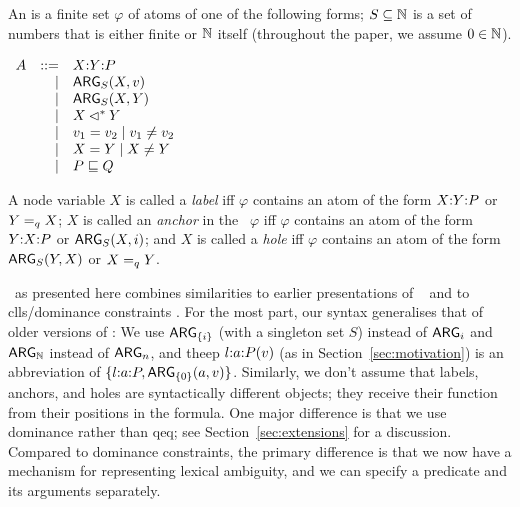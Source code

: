 \begin{definition}\label{defn:rmrs-syntax}
  An \emph{\rmrs} is a finite set $\varphi$ of atoms of one of the
  following forms; $S \subseteq \mathbb{N}$ is a set of numbers that is either
  finite or $\mathbb{N}$ itself (throughout the paper, we assume 
    $0 \in \mathbb{N}$).

$\begin{array}{rrll}
A &::= &\ep{X}{Y}{P} \\ %
&| &\ARG_S(X,v) \\ %
&| &\ARG_S(X,Y) \\ %
&| &X \dom Y \\ %
&| &v_1 = v_2 \;|\; v_1 \neq v_2 \\ %
&| &X = Y \;|\; X \neq Y \\ %
&| &P \spec Q %
\end{array}
$

A node variable $X$ is called a \emph{label} iff $\varphi$ contains an
atom of the form $X {:} Y {:} P$ or $Y =_q X$; $X$ is called an
\emph{anchor} in the \rmrs\ $\varphi$ iff $\varphi$ contains an atom
of the form $Y {:} X {:} P$ or $\mathsf{ARG}_S(X,i)$; and $X$ is called a
\emph{hole} iff $\varphi$ contains an atom of the form $\mathsf{ARG}_S(Y,X)$
or $X =_q Y$.
\end{definition}

\rmrs\ as presented here combines similarities to earlier
presentations of \rmrs\ \cite{copestake:2003,copestake:2007b} and to
{\sc clls}/dominance constraints \cite{egg:etal:2001}.  For the most part,
our syntax generalises that of older versions of \rmrs: We use
$\mathsf{ARG}_{\{i\}}$ (with a singleton set $S$) instead of $\mathsf{ARG}_i$ and
$\mathsf{ARG}_{\mathbb{N}}$ instead of $\mathsf{ARG}_n$, and the{\sc ep} $l {:} a {:} P(v)$
(as in Section~\ref{sec:motivation}) is an abbreviation of
$\{l {:} a {:} P, \mathsf{ARG}_{\{0\}}(a,v)\}$.  Similarly, we don't assume
that labels, anchors, and holes are syntactically different objects;
they receive their function from their positions in the formula.  One
major difference is that we use dominance rather than qeq; see
Section~\ref{sec:extensions} for a discussion.  Compared to dominance
constraints, the primary difference is that we now have a mechanism
for representing lexical ambiguity, and we can specify a predicate and
its arguments separately.



